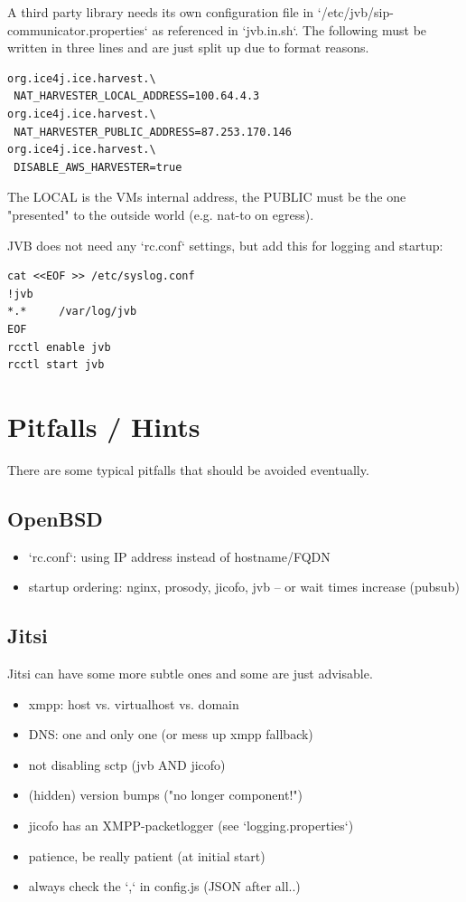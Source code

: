 \documentclass[10pt,conference]{IEEEtran}
\begin{document}
A third party library needs its own configuration file in `/etc/jvb/sip-communicator.properties`
as referenced in `jvb.in.sh`. The following must be written in three lines and are just
split up due to format reasons.
\begin{verbatim}
org.ice4j.ice.harvest.\
 NAT_HARVESTER_LOCAL_ADDRESS=100.64.4.3
org.ice4j.ice.harvest.\
 NAT_HARVESTER_PUBLIC_ADDRESS=87.253.170.146
org.ice4j.ice.harvest.\
 DISABLE_AWS_HARVESTER=true
\end{verbatim}
The LOCAL is the VMs internal address, the PUBLIC must be the one "presented" to the
outside world (e.g. nat-to on egress).

JVB does not need any `rc.conf` settings, but add this for logging and startup:
\begin{verbatim}
cat <<EOF >> /etc/syslog.conf
!jvb
*.*     /var/log/jvb
EOF
rcctl enable jvb
rcctl start jvb
\end{verbatim}

\section{Pitfalls / Hints}
There are some typical pitfalls that should be avoided eventually.

\subsection{OpenBSD}
\begin{itemize}
\item `rc.conf`: using IP address instead of hostname/FQDN
\item startup ordering: nginx, prosody, jicofo, jvb -- or wait times increase (pubsub)
\end{itemize}

\subsection{Jitsi}
Jitsi can have some more subtle ones and some are just advisable.
\begin{itemize}
\item xmpp: host vs. virtualhost vs. domain
\item DNS: one and only one (or mess up xmpp fallback)
\item not disabling sctp (jvb AND jicofo)
\item (hidden) version bumps ("no longer component!")
\item jicofo has an XMPP-packetlogger (see `logging.properties`)
\item patience, be really patient (at initial start)
\item always check the `,` in config.js (JSON after all..)
\end{itemize}
\end{document}
